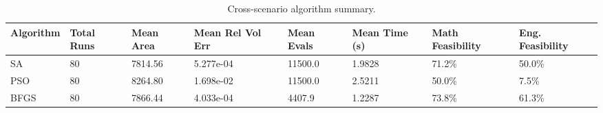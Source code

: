 \begin{table}[H]
\centering
\small
\setlength{\tabcolsep}{6pt}
\begin{tabular}{llllllll}
\toprule
Algorithm & Total Runs & Mean Area & Mean Rel Vol Err & Mean Evals & Mean Time (s) & Math Feasibility & Eng. Feasibility \\
\midrule
SA & 80 & 7814.56 & 5.277e-04 & 11500.0 & 1.9828 & 71.2\% & 50.0\% \\
PSO & 80 & 8264.80 & 1.698e-02 & 11500.0 & 2.5211 & 50.0\% & 7.5\% \\
BFGS & 80 & 7866.44 & 4.033e-04 & 4407.9 & 1.2287 & 73.8\% & 61.3\% \\
\bottomrule
\end{tabular}
\caption{Cross-scenario algorithm summary.}
\label{tab:algorithm-summary}
\end{table}
